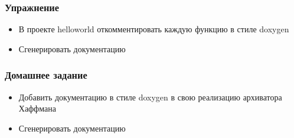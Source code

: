 \begin{frame}
 \frametitle{Упражнение}
  \begin{itemize}
    \item В проекте helloworld откомментировать каждую функцию в стиле doxygen
    \item Сгенерировать документацию
  \end{itemize}
\end{frame} 

\begin{frame}
 \frametitle{Домашнее задание}
  \begin{itemize}
    \item Добавить документацию  в стиле doxygen в свою реализацию архиватора Хаффмана
    \item Сгенерировать документацию
  \end{itemize}
\end{frame} 

